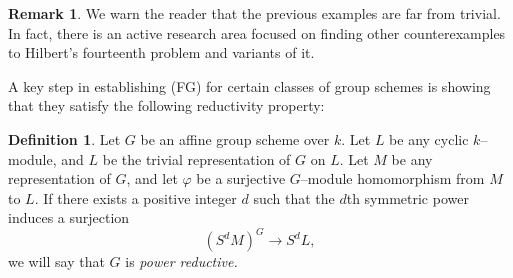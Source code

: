 \documentclass{article}
\theoremstyle{plain}
\theoremstyle{definition}
\newtheorem{Def}[Th]{Definition}
\newtheorem{Rem}[Th]{Remark}
\begin{document}
\begin{Rem}
    We warn the reader that the previous examples are far from trivial. In fact, there is an active research area focused on finding other counterexamples to Hilbert's fourteenth problem and variants of it. 
\end{Rem}


A key step in establishing (FG) for certain classes of group schemes is showing that they satisfy the following reductivity property:


\begin{Def}
    Let $G$ be an affine group scheme over $k$. Let $L$ be any cyclic $k$--module, and $L$ be the trivial representation of $G$ on $L$. Let $M$ be any representation of $G$, and let $\varphi$ be a surjective $G$--module homomorphism from $M$ to $L$. If there exists a positive integer $d$ such that the $d$th symmetric power induces a surjection 
    \[
    (S^dM)^G\to S^dL,
    \]
    we will say that $G$ is \textit{power reductive.}
\end{Def}
\end{document}
